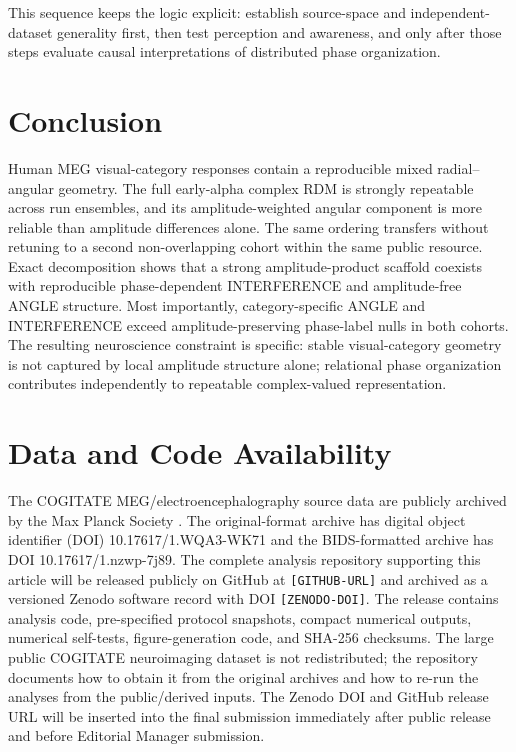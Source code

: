 \documentclass[11pt]{article}
\begin{document}
This sequence keeps the logic explicit: establish source-space and independent-dataset generality first, then test perception and awareness, and only after those steps evaluate causal interpretations of distributed phase organization.

\section{Conclusion}
Human MEG visual-category responses contain a reproducible mixed radial--angular geometry. The full early-alpha complex RDM is strongly repeatable across run ensembles, and its amplitude-weighted angular component is more reliable than amplitude differences alone. The same ordering transfers without retuning to a second non-overlapping cohort within the same public resource. Exact decomposition shows that a strong amplitude-product scaffold coexists with reproducible phase-dependent INTERFERENCE and amplitude-free ANGLE structure. Most importantly, category-specific ANGLE and INTERFERENCE exceed amplitude-preserving phase-label nulls in both cohorts. The resulting neuroscience constraint is specific: stable visual-category geometry is not captured by local amplitude structure alone; relational phase organization contributes independently to repeatable complex-valued representation.

\section*{Data and Code Availability}
The COGITATE MEG/electroencephalography source data are publicly archived by the Max Planck Society \citep{Liu2026}. The original-format archive has digital object identifier (DOI) 10.17617/1.WQA3-WK71 and the BIDS-formatted archive has DOI 10.17617/1.nzwp-7j89. The complete analysis repository supporting this article will be released publicly on GitHub at \texttt{[GITHUB-URL]} and archived as a versioned Zenodo software record with DOI \texttt{[ZENODO-DOI]}. The release contains analysis code, pre-specified protocol snapshots, compact numerical outputs, numerical self-tests, figure-generation code, and SHA-256 checksums. The large public COGITATE neuroimaging dataset is not redistributed; the repository documents how to obtain it from the original archives and how to re-run the analyses from the public/derived inputs. The Zenodo DOI and GitHub release URL will be inserted into the final submission immediately after public release and before Editorial Manager submission.
\end{document}
